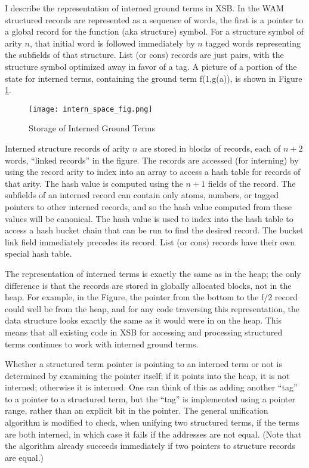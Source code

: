 \documentclass{llncs}
\begin{document}
I describe the representation of interned ground terms in XSB.  In the
WAM structured records are represented as a sequence of words, the
first is a pointer to a global record for the function (aka structure)
symbol.  For a structure symbol of arity $n$, that initial word is
followed immediately by $n$ tagged words representing the subfields of
that structure.  List (or cons) records are just pairs, with the
structure symbol optimized away in favor of a tag.  A picture of a
portion of the state for interned terms, containing the ground term
f(1,g(a)), is shown in Figure \ref{fig:internspace}.

\begin{figure}[ht]
\begin{center}
\texttt{[image: intern\_space\_fig.png]}
\end{center}
    \caption{Storage of Interned Ground Terms\label{fig:internspace}}
\end{figure}

Interned structure records of arity $n$ are stored in blocks of
records, each of $n+2$ words, ``linked records'' in the figure.  The
records are accessed (for interning) by using the record arity to
index into an array to access a hash table for records of that arity.
The hash value is computed using the $n+1$ fields of the record.  The
subfields of an interned record can contain only atoms, numbers, or
tagged pointers to other interned records, and so the hash value
computed from these values will be canonical.  The hash value is used
to index into the hash table to access a hash bucket chain that can be
run to find the desired record.  The bucket link field immediately
precedes its record.  List (or cons) records have their own special
hash table.

The representation of interned terms is exactly the same as in the
heap; the only difference is that the records are stored in globally
allocated blocks, not in the heap.  For example, in the Figure, the
pointer from the bottom to the f/2 record could well be from the heap,
and for any code traversing this representation, the data structure
looks exactly the same as it would were in on the heap. This means
that all existing code in XSB for accessing and processing structured
terms continues to work with interned ground terms.

Whether a structured term pointer is pointing to an interned term or
not is determined by examining the pointer itself; if it points into
the heap, it is not interned; otherwise it is interned.  One can think
of this as adding another ``tag'' to a pointer to a structured term, but
the ``tag'' is implemented using a pointer range, rather than an
explicit bit in the pointer.  The general unification algorithm is
modified to check, when unifying two structured terms, if the terms
are both interned, in which case it fails if the addresses are not
equal.  (Note that the algorithm already succeeds immediately if two
pointers to structure records are equal.)
\end{document}
